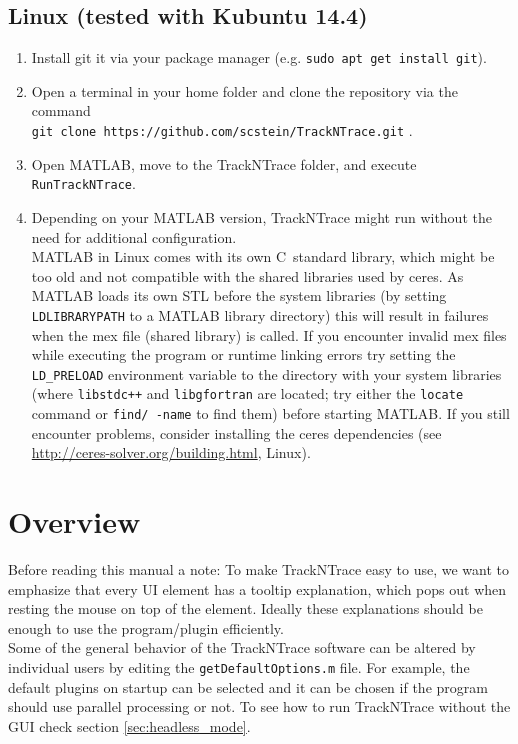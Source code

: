 \documentclass[11pt,onside]{report}
\numberwithin{equation}{chapter}
\def\CC{{C\nolinebreak[4]\hspace{-.05em}\raisebox{.3ex}{\tiny\bf ++}}}
\begin{document}
\subsection{Linux (tested with Kubuntu 14.4)}
\begin{enumerate}
\item Install git it via your package manager (e.g. \texttt{sudo apt get install git}).
\item Open a terminal in your home folder and clone the repository via the command \\ \texttt{git clone https://github.com/scstein/TrackNTrace.git} .
\item Open MATLAB, move to the TrackNTrace folder, and execute \texttt{RunTrackNTrace}.
\item Depending on your MATLAB version, TrackNTrace might run without the need for additional configuration.\\
MATLAB in Linux comes with its own \CC~standard library, which might be too old and not compatible with the shared libraries used by ceres. As MATLAB loads its own STL before the system libraries (by setting \texttt{LD\textunderscore LIBRARY\textunderscore PATH} to a MATLAB library directory) this will result  in failures when the mex file (shared library) is called. If you encounter invalid mex files while executing the program or runtime linking errors try setting the \texttt{LD\_PRELOAD} environment variable to the directory with your system libraries (where \texttt{libstdc++} and \texttt{libgfortran} are located; try either the \texttt{locate} command or \texttt{find/ -name} to find them) before starting MATLAB. If you still encounter problems, consider installing the ceres dependencies (see \url{http://ceres-solver.org/building.html}, Linux).
\end{enumerate}
\clearpage

\section{Overview}\label{sec:overview}
Before reading this manual a note: To make TrackNTrace easy to use, we want to emphasize that every UI element has a tooltip explanation, which pops out when resting the mouse on top of the element. Ideally these explanations should be enough to use the program/plugin efficiently.\\

Some of the general behavior of the TrackNTrace software can be altered by individual users by editing the \texttt{getDefaultOptions.m} file. For example, the default plugins on startup can be selected and it can be chosen if the program should use parallel processing or not. To see how to run TrackNTrace without the GUI check section \ref{sec:headless_mode}.
\end{document}

